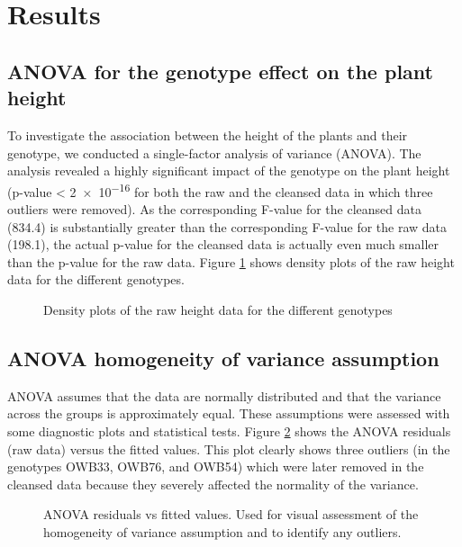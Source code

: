 \section{Results}

\subsection{ANOVA for the genotype effect on the plant height}

To investigate the association between the height of the plants and their genotype, we conducted a single-factor analysis of variance (ANOVA). The analysis revealed a highly significant impact of the genotype on the plant height (p-value < \num{2e-16} for both the raw and the cleansed data in which three outliers were removed). As the corresponding F-value for the cleansed data (\num{834.4}) is substantially greater than the corresponding F-value for the raw data (\num{198.1}), the actual p-value for the cleansed data is actually even much smaller than the p-value for the raw data. Figure \ref{fig:raw_genotype_height} shows density plots of the raw height data for the different genotypes.

\begin{figure}[htbp]
    
    \caption{Density plots of the raw height data for the different genotypes}
    \label{fig:raw_genotype_height}
\end{figure}

\subsection{ANOVA homogeneity of variance assumption}

ANOVA assumes that the data are normally distributed and that the variance across the groups is approximately equal. These assumptions were assessed with some diagnostic plots and statistical tests. Figure \ref{fig:raw_aov_height_residuals_vs_fit} shows the ANOVA residuals (raw data) versus the fitted values. This plot clearly shows three outliers (in the genotypes OWB33, OWB76, and OWB54) which were later removed in the cleansed data because they severely affected the normality of the variance.

\begin{figure}[htbp]
    
    \caption{ANOVA residuals vs fitted values. Used for visual assessment of the homogeneity of variance assumption and to identify any outliers.}
    \label{fig:raw_aov_height_residuals_vs_fit}
\end{figure}

